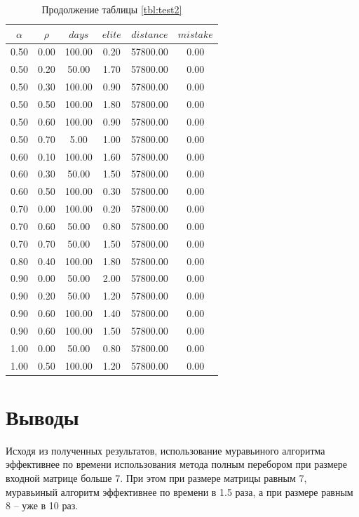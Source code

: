 \begin{table}
	\caption{Продолжение таблицы \ref{tbl:test2}\label{tbl:test2.1}}
	\begin{tabular}[c]{|c|c|c|c|c|c|}
        \hline
		$\alpha$ & $\rho$ & $days$ & $elite$ & $distance$ & $mistake$ \\
		\hline  
        0.50 & 0.00 & 100.00 & 0.20 & 57800.00 & 0.00 \\
        0.50 & 0.20 & 50.00 & 1.70 & 57800.00 & 0.00 \\
        0.50 & 0.30 & 100.00 & 0.90 & 57800.00 & 0.00 \\
        0.50 & 0.50 & 100.00 & 1.80 & 57800.00 & 0.00 \\
        0.50 & 0.60 & 100.00 & 0.90 & 57800.00 & 0.00 \\
        0.50 & 0.70 & 5.00 & 1.00 & 57800.00 & 0.00 \\
        0.60 & 0.10 & 100.00 & 1.60 & 57800.00 & 0.00 \\
        0.60 & 0.30 & 50.00 & 1.50 & 57800.00 & 0.00 \\
        0.60 & 0.50 & 100.00 & 0.30 & 57800.00 & 0.00 \\
        0.70 & 0.00 & 100.00 & 0.20 & 57800.00 & 0.00 \\
        0.70 & 0.60 & 50.00 & 0.80 & 57800.00 & 0.00 \\
        0.70 & 0.70 & 50.00 & 1.50 & 57800.00 & 0.00 \\
        0.80 & 0.40 & 100.00 & 1.80 & 57800.00 & 0.00 \\
        0.90 & 0.00 & 50.00 & 2.00 & 57800.00 & 0.00 \\
        0.90 & 0.20 & 50.00 & 1.20 & 57800.00 & 0.00 \\
        0.90 & 0.60 & 100.00 & 1.40 & 57800.00 & 0.00 \\
        0.90 & 0.60 & 100.00 & 1.50 & 57800.00 & 0.00 \\
        1.00 & 0.00 & 50.00 & 0.80 & 57800.00 & 0.00 \\
        1.00 & 0.50 & 100.00 & 1.20 & 57800.00 & 0.00 \\ \hline
\end{tabular}
\end{table}
\clearpage
\section{Выводы}
Исходя из полученных результатов, использование муравьиного алгоритма эффективнее по времени использования метода полным перебором при размере входной матрице больше 7.
При этом при размере матрицы равным 7, муравьиный алгоритм эффективнее по времени в 1.5 раза, а при размере равным 8 -- уже в 10 раз.

